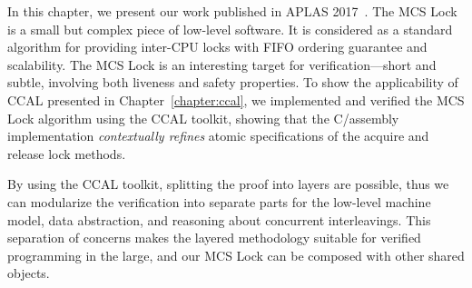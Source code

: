 


In this chapter, we present our work published in APLAS 2017~\cite{mcslock}.
The MCS Lock is a small but complex piece of low-level software.
It is considered as a standard algorithm for providing inter-CPU locks with FIFO ordering guarantee and scalability.
The MCS Lock is an interesting target for verification---short and subtle, involving both liveness and safety properties. 
To show the applicability of CCAL presented in Chapter~\ref{chapter:ccal},
we implemented and verified the MCS Lock algorithm using the CCAL toolkit, 
showing that the C/assembly implementation {\em contextually refines} atomic specifications of the acquire and release lock methods.

By using the CCAL toolkit, splitting the proof into layers are possible,
thus we can modularize the verification into separate parts for the low-level machine model, data abstraction, and reasoning about concurrent interleavings.
  This separation of concerns makes the layered methodology suitable for verified programming in the large, and our 
  MCS Lock can be composed with other shared objects.

